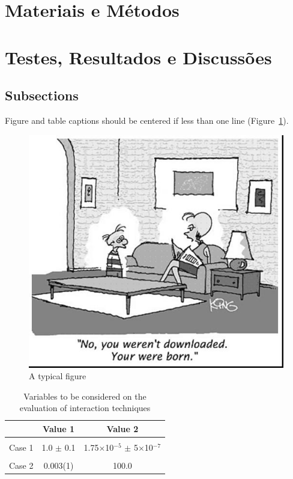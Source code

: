 \begin{document}

\section{Materiais e Métodos} \label{sec:mat_metodos}


\section{Testes, Resultados e Discussões} \label{sec:testes}


\subsection{Subsections}


Figure and table captions should be centered if less than one line
(Figure~\ref{fig:exampleFig1}).

\begin{figure}[ht]
\centering
\includegraphics[width=.5\textwidth]{fig1.jpg}
\caption{A typical figure}
\label{fig:exampleFig1}
\end{figure}

\begin{table}[ht]
\centering
\caption{Variables to be considered on the evaluation of interaction
  techniques}
\label{tab:exTable1}
\smallskip
\begin{tabular}{|l|c|c|}
\hline
& Value 1 & Value 2\\[0.5ex]
\hline
&&\\[-2ex]
Case 1 & 1.0 $\pm$ 0.1 & 1.75$\times$10$^{-5}$ $\pm$ 5$\times$10$^{-7}$\\[0.5ex]
\hline
&&\\[-2ex]
Case 2 & 0.003(1) & 100.0\\[0.5ex]
\hline
\end{tabular}
\end{table}
\end{document}
